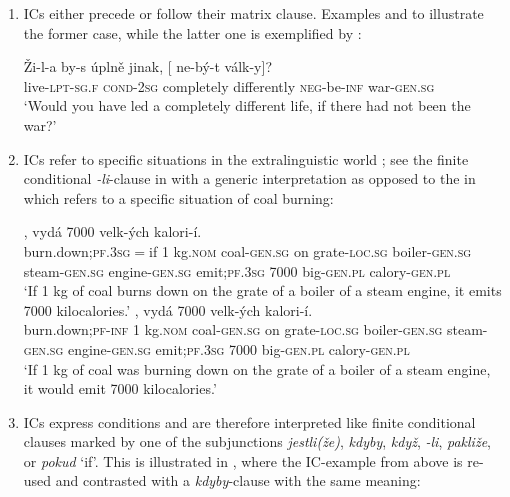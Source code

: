 \documentclass[output=paper,colorlinks,citecolor=brown,newtxmath]{langsci/langscibook}
\begin{document}
\begin{enumerate}
\item ICs either precede or follow their matrix clause. Examples  and  to  illustrate the former case, while the latter one is exemplified by :

\ea\label{ex:war}
\gll Ži-l-a by-s úplně jinak, [\hspace{-2pt} ne-bý-t válk-y]?\\
     live-\textsc{lpt-sg.f} \textsc{cond-2sg} completely differently {} \textsc{neg}-be-\textsc{inf} war-\textsc{gen.sg}\\
\glt `Would you have led a completely different life, if there had not been the war?' \hfill \citep[;][7]{Milotova2012}
\z

\item ICs refer to specific situations in the extralinguistic world \citep[77]{Svoboda1960a}; see the finite conditional \textit{-li}-clause in  with a generic interpretation as opposed to the  in  which refers to a specific situation of coal burning:

\ea\label{ex:kettle}
\ea\label{ex:kettle-a}
, vydá 7000 velk-ých kalori-í.\\
     {} {burn.down};\textsc{pf}.\textsc{3sg}$=$if 1 kg.\textsc{nom} coal-\textsc{gen.sg} on grate-\textsc{loc.sg} boiler-\textsc{gen.sg} steam-\textsc{gen.sg} engine-\textsc{gen.sg} emit;\textsc{pf}.\textsc{3sg} 7000 big-\textsc{gen.pl} calory-\textsc{gen.pl}\\
\glt `If 1 kg of coal burns down on the grate of a boiler of a steam engine, it emits 7000 kilocalories.'
\ex\label{ex:kettle-b}
, vydá 7000 velk-ých kalori-í.\\
     {} {burn.down};\textsc{pf}-\textsc{inf} 1 kg.\textsc{nom} coal-\textsc{gen.sg} on grate-\textsc{loc.sg} boiler-\textsc{gen.sg} steam-\textsc{gen.sg} engine-\textsc{gen.sg} emit;\textsc{pf}.\textsc{3sg} 7000 big-\textsc{gen.pl} calory-\textsc{gen.pl}\\
\glt `If 1 kg of coal was burning down on the grate of a boiler of a steam engine, it would emit 7000 kilocalories.' \\ \hfill \citep[;][77]{Svoboda1960a}
\z
\z

\item ICs express conditions and are therefore interpreted like finite conditional clauses marked by one of the subjunctions \textit{jestli(že)}, \textit{kdyby}, \textit{když}, \textit{-li}, \textit{pakliže}, or \textit{pokud} `if'. This is illustrated in , where the IC-example  from above is re-used and contrasted with a \textit{kdyby}-clause with the same meaning:


\end{enumerate}
\end{document}
